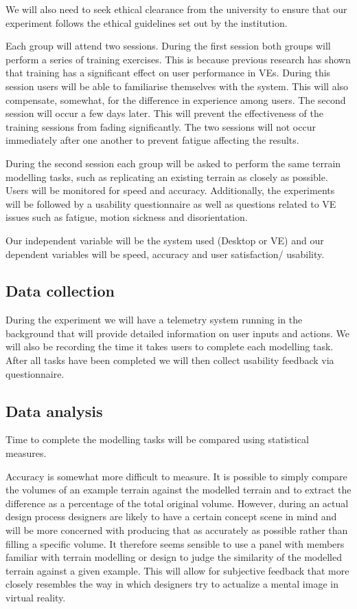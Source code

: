 \documentclass{sig-alternate-05-2015}
\begin{document}
We will also need to seek ethical clearance from the university to ensure that our experiment follows the ethical guidelines set out by the institution.

Each group will attend two sessions. During the first session both groups will perform a series of training exercises. This is because  previous research has shown that training has a significant effect on user performance in VEs\cite{Schultheis2012}. During this session users will be able to familiarise themselves with the system. This will also compensate, somewhat, for the difference in experience among users. The second session will occur a few days later. This will prevent the effectiveness of the training sessions from fading significantly. The two sessions will not occur immediately after one another to prevent fatigue affecting the results.

During the second session each group will be asked to perform the same terrain modelling tasks, such as replicating an existing terrain as closely as possible. Users will be monitored for speed and accuracy. Additionally, the experiments will be followed by a usability questionnaire as well as questions related to VE issues such as fatigue, motion sickness and disorientation.

Our independent variable will be the system used (Desktop or VE) and our dependent variables will be speed, accuracy and user satisfaction/ usability.

\subsection{Data collection}
During the experiment we will have a telemetry system running in the background that will provide detailed information on user inputs and actions. We will also be recording the time it takes users to complete each modelling task. After all tasks have been completed we will then collect usability feedback via questionnaire.
\subsection{Data analysis}
Time to complete the modelling tasks will be compared using statistical measures.

Accuracy is somewhat more difficult to measure. It is possible to simply compare the volumes of an example terrain against the modelled terrain and to extract the difference as a percentage of the total original volume. However, during an actual design process designers are likely to have a certain concept scene in mind and will be more concerned with producing that as accurately as possible rather than filling a specific volume. It therefore seems sensible to use a panel with members familiar with terrain modelling or design to judge the similarity of the modelled terrain against a given example. This will allow for subjective feedback that more closely resembles the way in which designers try to actualize a mental image in virtual reality.
\end{document}
